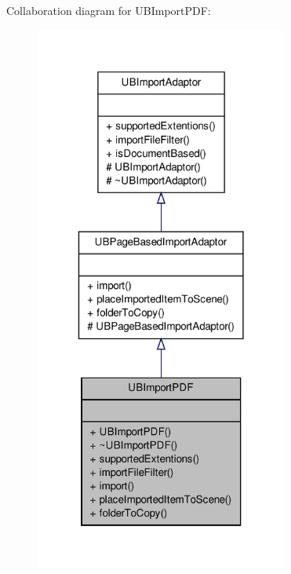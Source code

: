 Collaboration diagram for U\-B\-Import\-P\-D\-F\-:
\nopagebreak
\begin{figure}[H]
\begin{center}
\leavevmode
\includegraphics[width=236pt]{d6/d09/class_u_b_import_p_d_f__coll__graph}
\end{center}
\end{figure}
